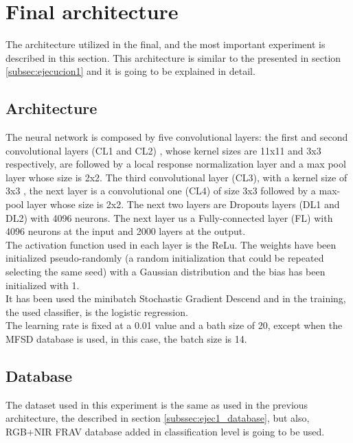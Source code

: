\section{Final architecture}\label{sec:Final_archi} %
The architecture utilized in the final, and the most important experiment is described in this section. This architecture is similar to the presented in section \ref{subsec:ejecucion1} and it is going to be explained in detail.

\subsection{Architecture}
The neural network is composed by five convolutional layers: the first and second convolutional layers (CL1 and CL2) , whose kernel sizes are 11x11 and 3x3 respectively, are followed by a local response normalization layer and a max pool layer whose size is 2x2. The third convolutional layer (CL3), with a kernel size of 3x3 , the next layer is a convolutional one (CL4) of size 3x3 followed by a max-pool layer whose size is 2x2. The next two layers are Dropouts layers (DL1 and DL2) with 4096 neurons. The next layer us a Fully-connected layer (FL) with 4096 neurons at the input and 2000 layers at the output.\\

The activation function used in each layer is the ReLu. The weights have been initialized pseudo-randomly (a random initialization that could be repeated selecting the same seed) with a Gaussian distribution and the bias has been initialized with 1.\\

It has been used the minibatch Stochastic Gradient Descend and in the training, the used classifier, is the logistic regression.\\

The learning rate is fixed at a 0.01 value and a bath size of 20, except when the MFSD database is used, in this case, the batch size is 14.

\subsection{Database}
The dataset used in this experiment is the same as used in the previous architecture, the described in section \ref{subssec:ejec1_database}, but also, RGB+NIR FRAV database added in classification level is going to be used.\\

